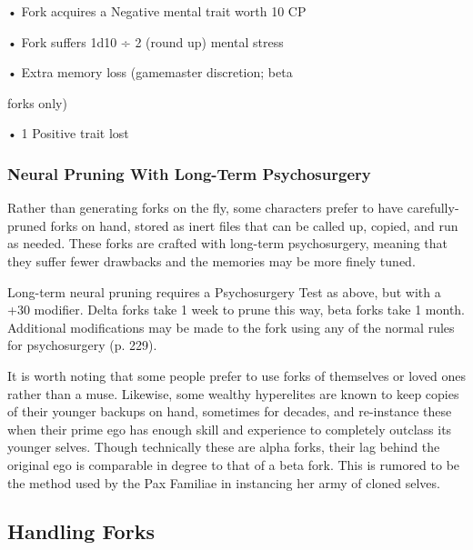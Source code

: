 •  Fork acquires a Negative mental trait worth 10 CP

•  Fork suffers 1d10 ÷ 2 (round up) mental stress

•  Extra memory loss (gamemaster discretion; beta 

forks only)

•  1 Positive trait lost

\subsubsection{Neural Pruning With Long-Term Psychosurgery}

Rather than generating forks on the fly, some characters
prefer to have carefully-pruned forks on hand,
stored as inert files that can be called up, copied, and 
run as needed. These forks are crafted with long-term 
psychosurgery, meaning that they suffer fewer drawbacks
and the memories may be more finely tuned.

Long-term neural pruning requires a Psychosurgery 
Test as above, but with a +30 modifier. Delta forks take 
1 week to prune this way, beta forks take 1 month. Additional
modifications may be made to the fork using
any of the normal rules for psychosurgery (p. 229).

It is worth noting that some people prefer to use 
forks of themselves or loved ones rather than a muse. 
Likewise, some wealthy hyperelites are known to keep 
copies of their younger backups on hand, sometimes 
for decades, and re-instance these when their prime 
ego has enough skill and experience to completely 
outclass its younger selves. Though technically these 
are alpha forks, their lag behind the original ego is 
comparable in degree to that of a beta fork. This is 
rumored to be the method used by the Pax Familiae 
in instancing her army of cloned selves.

\subsection{Handling Forks}

